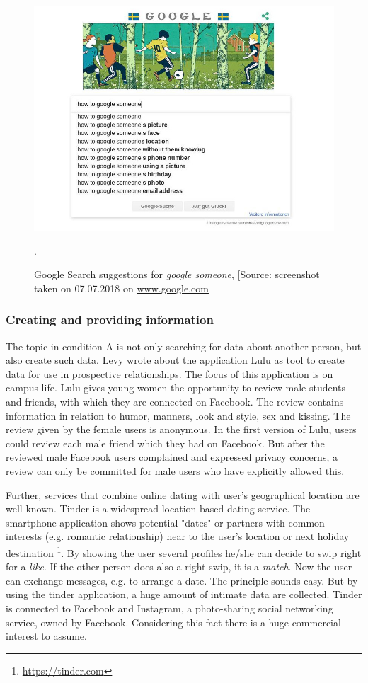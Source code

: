 \begin{figure}[htb]
  \centering
  \includegraphics[width=\linewidth]{img/how_to_google_someone.jpeg}
  \caption{Google Search suggestions for \textit{google someone}, [Source: screenshot taken on 07.07.2018 on \url{www.google.com}}.
  \label{fig:how_to_google_someone}
\end{figure}

\subsubsection{Creating and providing information}
The topic in condition A is not only searching for data about another person, but also create such data. Levy \cite{levy2014intimate} wrote about the application Lulu as tool to create data for use in prospective relationships. The focus of this application is on campus life. Lulu gives young women the opportunity to review male students and friends, with which they are connected on Facebook. The review contains information in relation to humor, manners, look and style, sex and kissing. The review given by the female users is anonymous. In the first version of Lulu, users could review each male friend which they had on Facebook. But after the reviewed male Facebook users complained and expressed privacy concerns, a review can only be committed for male users who have explicitly allowed this.

Further, services that combine online dating with user's geographical location are well known. Tinder is a widespread location-based dating service. The smartphone application shows potential "dates" or partners with common interests (e.g. romantic relationship) near to the user's location or next holiday destination \footnote{\url{https://tinder.com}}. By showing the user several profiles he/she can decide to swip right for a \textit{like}. If the other person does also a right swip, it is a \textit{match}. Now the user can exchange messages, e.g. to arrange a date. The principle sounds easy. But by using the tinder application, a huge amount of intimate data are collected. 
Tinder is connected to Facebook and Instagram, a photo-sharing social networking service, owned by Facebook. Considering this fact there is a huge commercial interest to assume.


